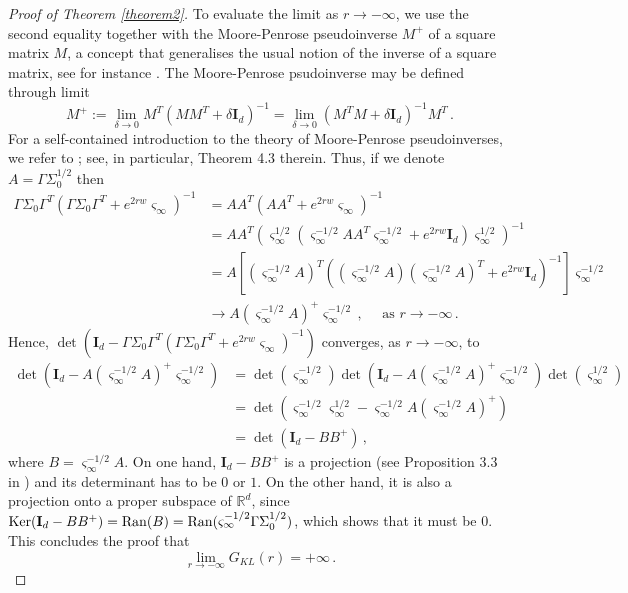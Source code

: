 \documentclass[12pt,thmsa]{article}
\begin{document}
\begin{proof}[Proof of Theorem \ref{theorem2}]
	To evaluate the limit as $r\to-\infty$, we use the second equality together with the Moore-Penrose pseudoinverse $M^+$ of a square matrix $M$, a concept that generalises the usual notion of the inverse of a square matrix, see for instance \cite{Mo,Pe}. The Moore-Penrose psudoinverse may be defined through limit
	\begin{equation}\label{moore-penrose}
		M^{+}:=\lim_{\delta\to 0}M^T\left(MM^T+\delta  \mathbf{I}_d\right)^{-1} =\lim_{\delta\to 0}\left(M^TM+\delta  \mathbf{I}_d\right)^{-1}M^T\,.
	\end{equation}
	For a self-contained introduction to the theory of Moore-Penrose pseudoinverses, we refer to \cite{BH}; see, in particular, Theorem 4.3 therein. Thus, if we denote $A=\Gamma \Sigma_0^{1/2}$ then  
	\[
	\begin{split}
		\Gamma\Sigma_0\Gamma^T\left(\Gamma\Sigma_0\Gamma^T+ e^{2rw}\varsigma_{\infty} \right)^{-1}&=AA^T\left(AA^T+ e^{2rw}\varsigma_{\infty} \right)^{-1} \\
		&= AA^T\left(\varsigma_\infty^{1/2}\left(\varsigma_\infty^{-1/2}AA^T\varsigma_\infty^{-1/2}+ e^{2rw}\mathbf{I}_d\right)\varsigma_\infty^{1/2} \right)^{-1}\\
		&= A\left[(\varsigma_\infty^{-1/2}A)^T\left((\varsigma_\infty^{-1/2}A)(\varsigma_\infty^{-1/2}A)^T+ e^{2rw}\mathbf{I}_d \right)^{-1}\right]\varsigma_\infty^{-1/2}\\
		&\to A\left(\varsigma_\infty^{-1/2}A\right)^+\varsigma_\infty^{-1/2}\,,\quad\mbox{ as $r\to-\infty$}\,.
	\end{split}
	\]
	Hence, $\det\left( \mathbf{I}_d- \Gamma\Sigma_0\Gamma^T\left(\Gamma\Sigma_0\Gamma^T+ e^{2rw} \varsigma_{\infty} \right)^{-1}\right)$ converges, as $r\to-\infty$,  to 
	\[
	\begin{split}
		\det\left( \mathbf{I}_d- A\left(\varsigma_\infty^{-1/2}A\right)^+\varsigma_\infty^{-1/2}\right)&=\det\left( \varsigma_\infty^{-1/2}\right)\det\left( \mathbf{I}_d- A\left(\varsigma_\infty^{-1/2}A\right)^+\varsigma_\infty^{-1/2}\right)\det\left( \varsigma_\infty^{1/2}\right)\\
		&= \det\left(\varsigma_\infty^{-1/2}\varsigma_\infty^{1/2}- \varsigma_\infty^{-1/2}A\left(\varsigma_\infty^{-1/2}A\right)^+\right)\\
		&=\det\left(\mathbf{I}_d- BB^+\right)\,,
	\end{split}
	\]
	where $B=\varsigma_\infty^{-1/2}A$. On one hand, $\mathbf{I}_d-BB^+$ is a projection (see Proposition 3.3 in \cite{BH}) and its determinant has to be $0$ or $1$. On the other hand, it is also a projection onto a proper subspace of $\mathbb{R}^d$, since ${\rm Ker}(\mathbf{I}_d-BB^+)={\rm Ran}(B)={\rm Ran}( \varsigma_\infty^{-1/2}\Gamma \Sigma_0^{1/2})$, which shows that it must be $0$. This concludes the proof that
	$$\lim_{r\to-\infty}G_{KL}(r)=+\infty\,.$$
	

\end{proof}
\end{document}
